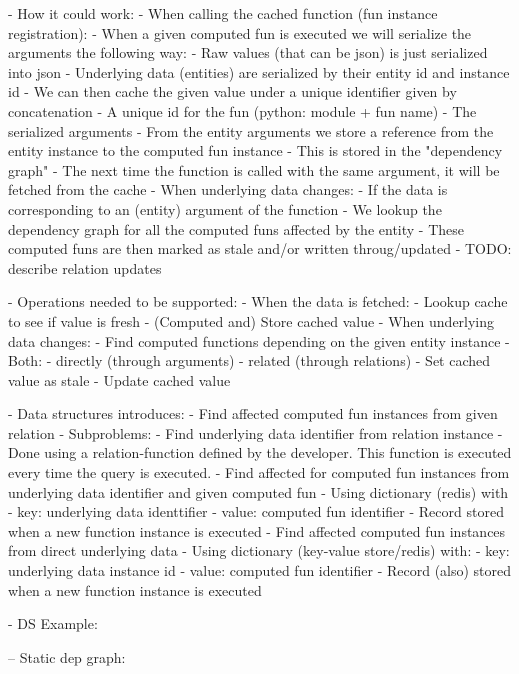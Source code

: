 - How it could work:
  - When calling the cached function (fun instance registration):
    - When a given computed fun is executed we will serialize the arguments the following way:
      - Raw values (that can be json) is just serialized into json
      - Underlying data (entities) are serialized by their entity id and instance id
    - We can then cache the given value under a unique identifier given by concatenation
      - A unique id for the fun (python: module + fun name)
      - The serialized arguments
    - From the entity arguments we store a reference from the entity instance to the computed fun instance
      - This is stored in the "dependency graph"
    - The next time the function is called with the same argument, it will be fetched from the cache
  - When underlying data changes:
    - If the data is corresponding to an (entity) argument of the function
      - We lookup the dependency graph for all the computed funs affected by the entity
      - These computed funs are then marked as stale and/or written throug/updated
  - TODO: describe relation updates

- Operations needed to be supported:
  - When the data is fetched:
    - Lookup cache to see if value is fresh
    - (Computed and) Store cached value
  - When underlying data changes:
    - Find computed functions depending on the given entity instance
      - Both:
        - directly (through arguments)
        - related (through relations)
    - Set cached value as stale
    - Update cached value

- Data structures introduces:
  - Find affected computed fun instances from given relation
    - Subproblems:
      - Find underlying data identifier from relation instance
        - Done using a relation-function defined by the developer. This
          function is executed every time the query is executed.
      - Find affected for computed fun instances from underlying data identifier and given computed fun
        - Using dictionary (redis) with
          - key: underlying data identtifier
          - value: computed fun identifier
        - Record stored when a new function instance is executed
  - Find affected computed fun instances from direct underlying data
    - Using dictionary (key-value store/redis) with:
      - key: underlying data instance id
      - value: computed fun identifier
    - Record (also) stored when a new function instance is executed

- DS Example:

-- Static dep graph:

